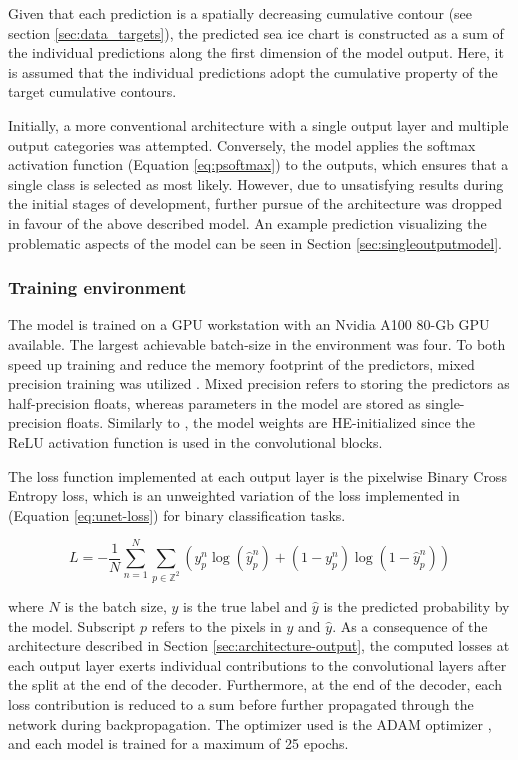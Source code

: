 \documentclass[../main/thesis]{subfiles}
\begin{document}
Given that each prediction is a spatially decreasing cumulative contour (see section \ref{sec:data_targets}), the predicted sea ice chart is constructed as a sum of the individual predictions along the first dimension of the model output. Here, it is assumed that the individual predictions adopt the cumulative property of the target cumulative contours. 

Initially, a more conventional architecture with a single output layer and multiple output categories \citep{Ronneberger2015} was attempted. Conversely, the model applies the softmax activation function (Equation \ref{eq:psoftmax}) to the outputs, which ensures that a single class is selected as most likely. However, due to unsatisfying results during the initial stages of development, further pursue of the architecture was dropped in favour of the above described model. An example prediction visualizing the problematic aspects of the model can be seen in Section \ref{sec:singleoutputmodel}. 

\subsubsection{Training environment}
\label{sec:train_env}
The model is trained on a GPU workstation with an Nvidia A100 80-Gb GPU available. The largest achievable batch-size in the environment was four. To both speed up training and reduce the memory footprint of the predictors, mixed precision training was utilized \citep{Micikevicius2017}. Mixed precision refers to storing the predictors as half-precision floats, whereas parameters in the model are stored as single-precision floats. Similarly to \citet{Ronneberger2015}, the model weights are HE-initialized \citep{He2015} since the ReLU activation function \citep{Nair2010} is used in the convolutional blocks.

The loss function implemented at each output layer is the pixelwise Binary Cross Entropy loss, which is an unweighted variation of the loss implemented in \citet{Ronneberger2015} (Equation \ref{eq:unet-loss}) for binary classification tasks. 

\begin{equation}
    \label{eq:loss}
    L = -\frac{1}{N}\sum_{n = 1}^N\sum_{p \in \mathbb{Z}^2}\left(y_p^n\log{(\hat{y}_p^n)} + \left(1 - y_p^n\right)\log{(1 - \hat{y}_p^n)}\right)
\end{equation}

where $N$ is the batch size, $y$ is the true label and $\hat{y}$ is the predicted probability by the model. Subscript $p$ refers to the pixels in $y$ and $\hat{y}$. As a consequence of the architecture described in Section \ref{sec:architecture-output}, the computed losses at each output layer exerts individual contributions to the convolutional layers after the split at the end of the decoder. Furthermore, at the end of the decoder, each loss contribution is reduced to a sum before further propagated through the network during backpropagation. The optimizer used is the ADAM optimizer \citep{Kingma2014}, and each model is trained for a maximum of 25 epochs.
\end{document}

